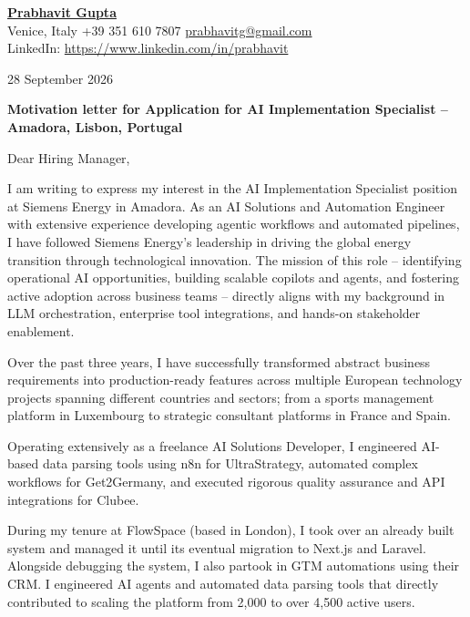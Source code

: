 \documentclass[10pt,a4paper]{article}
\begin{document}
\thispagestyle{empty}


\textbf{\underline{\Large Prabhavit Gupta}}\\[3pt]
Venice, Italy \textbar{} +39 351 610 7807 \textbar{} \href{mailto:prabhavitg@gmail.com}{prabhavitg@gmail.com}\\
LinkedIn: \href{https://www.linkedin.com/in/prabhavit}{https://www.linkedin.com/in/prabhavit}

\vspace{10pt}
28 September 2026

\vspace{5pt}
\textbf{Motivation letter for Application for AI Implementation Specialist -- Amadora, Lisbon, Portugal}

\vspace{5pt}
Dear Hiring Manager,

I am writing to express my interest in the AI Implementation Specialist position at Siemens Energy in Amadora. As an AI Solutions and Automation Engineer with extensive experience developing agentic workflows and automated pipelines, I have followed Siemens Energy's leadership in driving the global energy transition through technological innovation. The mission of this role -- identifying operational AI opportunities, building scalable copilots and agents, and fostering active adoption across business teams -- directly aligns with my background in LLM orchestration, enterprise tool integrations, and hands-on stakeholder enablement.

Over the past three years, I have successfully transformed abstract business requirements into production-ready features across multiple European technology projects spanning different countries and sectors; from a sports management platform in Luxembourg to strategic consultant platforms in France and Spain.

Operating extensively as a freelance AI Solutions Developer, I engineered AI-based data parsing tools using n8n for UltraStrategy, automated complex workflows for Get2Germany, and executed rigorous quality assurance and API integrations for Clubee.

During my tenure at FlowSpace (based in London), I took over an already built system and managed it until its eventual migration to Next.js and Laravel. Alongside debugging the system, I also partook in GTM automations using their CRM. I engineered AI agents and automated data parsing tools that directly contributed to scaling the platform from 2,000 to over 4,500 active users.
\end{document}
